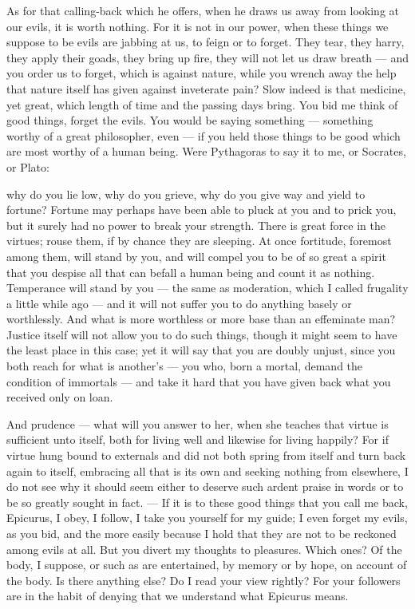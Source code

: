  As for that calling-back which he offers, when he draws us away from looking at our evils, it is worth nothing. For it is not in our power, when these things we suppose to be evils are jabbing at us, to feign or to forget. They tear, they harry, they apply their goads, they bring up fire, they will not let us draw breath — and you order us to forget, which is against nature, while you wrench away the help that nature itself has given against inveterate pain? Slow indeed is that medicine, yet great, which length of time and the passing days bring. You bid me think of good things, forget the evils. You would be saying something — something worthy of a great philosopher, even — if you held those things to be good which are most worthy of a human being. Were Pythagoras to say it to me, or Socrates, or Plato:

 why do you lie low, why do you grieve, why do you give way and yield to fortune? Fortune may perhaps have been able to pluck at you and to prick you, but it surely had no power to break your strength. There is great force in the virtues; rouse them, if by chance they are sleeping. At once fortitude, foremost among them, will stand by you, and will compel you to be of so great a spirit that you despise all that can befall a human being and count it as nothing. Temperance will stand by you — the same as moderation, which I called frugality a little while ago — and it will not suffer you to do anything basely or worthlessly. And what is more worthless or more base than an effeminate man? Justice itself will not allow you to do such things, though it might seem to have the least place in this case; yet it will say that you are doubly unjust, since you both reach for what is another's — you who, born a mortal, demand the condition of immortals — and take it hard that you have given back what you received only on loan.

 And prudence — what will you answer to her, when she teaches that virtue is sufficient unto itself, both for living well and likewise for living happily? For if virtue hung bound to externals and did not both spring from itself and turn back again to itself, embracing all that is its own and seeking nothing from elsewhere, I do not see why it should seem either to deserve such ardent praise in words or to be so greatly sought in fact. — If it is to these good things that you call me back, Epicurus, I obey, I follow, I take you yourself for my guide; I even forget my evils, as you bid, and the more easily because I hold that they are not to be reckoned among evils at all. But you divert my thoughts to pleasures. Which ones? Of the body, I suppose, or such as are entertained, by memory or by hope, on account of the body. Is there anything else? Do I read your view rightly? For your followers are in the habit of denying that we understand what Epicurus means.

